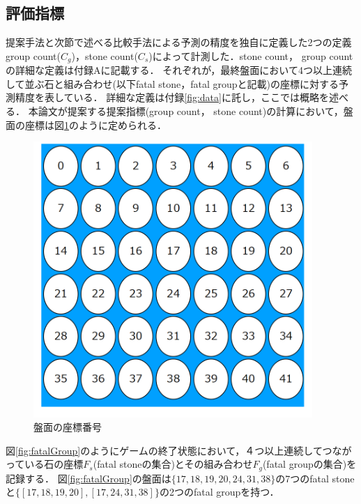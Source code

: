 \subsection{評価指標}
提案手法と次節で述べる比較手法による予測の精度を独自に定義した2つの定義group count($C_g$)，stone count($C_s$)によって計測した．stone count， group countの詳細な定義は付録Aに記載する．
それぞれが，最終盤面において4つ以上連続して並ぶ石と組み合わせ(以下fatal stone，fatal groupと記載)の座標に対する予測精度を表している．
詳細な定義は付録\ref{fig:data}に託し，ここでは概略を述べる．
本論文が提案する提案指標(group count， stone count)の計算において，盤面の座標は図\ref{fig:index}のように定められる．
\begin{figure}[t]
	\centering
	\includegraphics[width=300pt]{./figure/index.png}
	\caption{盤面の座標番号}
	\label{fig:index}
\end{figure}
図\ref{fig:fatalGroup}のようにゲームの終了状態において，４つ以上連続してつながっている石の座標$F_s$(fatal stoneの集合)とその組み合わせ$F_g$(fatal groupの集合)を記録する．
図\ref{fig:fatalGroup}の盤面は$\{17, 18, 19, 20, 24, 31, 38\}$の7つのfatal stoneと$\{[17, 18, 19, 20], [17, 24, 31, 38]\}$の2つのfatal groupを持つ．
